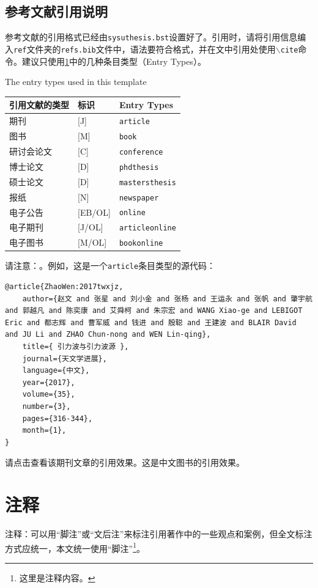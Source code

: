 \subsection{参考文献引用说明}

参考文献的引用格式已经由\texttt{sysuthesis.bst}设置好了。引用时，请将引用信息编入\texttt{ref}文件夹的\texttt{refs.bib}文件中，语法要符合格式，并在文中引用处使用\texttt{$\backslash$cite}命令。建议只使用\ref{tab:entrytypes}中的几种条目类型（Entry Types）。
\begin{table}[!htp]
    {The entry types used in this template}
    \label{tab:entrytypes}
    \centering
    \begin{tabular}{lll}
    \hline
    引用文献的类型  & 标识 & Entry Types \\
    \hline
    期刊    &[J] & \texttt{article} \\
    图书    &[M] & \texttt{book} \\
    研讨会论文 &[C]    & \texttt{conference} \\  
    博士论文   &[D]  & \texttt{phdthesis} \\
    硕士论文   &[D]  & \texttt{mastersthesis} \\
    报纸      &[N] & \texttt{newspaper} \\
    电子公告   &[EB/OL] & \texttt{online} \\
    电子期刊   &[J/OL] & \texttt{articleonline} \\
    电子图书   &[M/OL] & \texttt{bookonline} \\
    \hline
    \end{tabular}
\end{table}
请注意：。例如，这是一个\texttt{article}条目类型的源代码：
\begin{lstlisting}
@article{ZhaoWen:2017twxjz,
    author={赵文 and 张星 and 刘小金 and 张杨 and 王运永 and 张帆 and 肇宇航 and 郭越凡 and 陈奕康 and 艾舜柯 and 朱宗宏 and WANG Xiao-ge and LEBIGOT Eric and 都志辉 and 曹军威 and 钱进 and 殷聪 and 王建波 and BLAIR David and JU Li and ZHAO Chun-nong and WEN Lin-qing},
    title={ 引力波与引力波源 },
    journal={天文学进展},
    language={中文},
    year={2017},
    volume={35},
    number={3},
    pages={316-344},
    month={1},
}
\end{lstlisting}
请点击\cite{ZhaoWen:2017twxjz}查看该期刊文章的引用效果。这是中文图书的引用效果\cite{Huang:2012hxwl}。

\section{注释}

注释：可以用“脚注”或“文后注”来标注引用著作中的一些观点和案例，但全文标注方式应统一，本文统一使用“脚注”\footnote{这里是注释内容。}。
